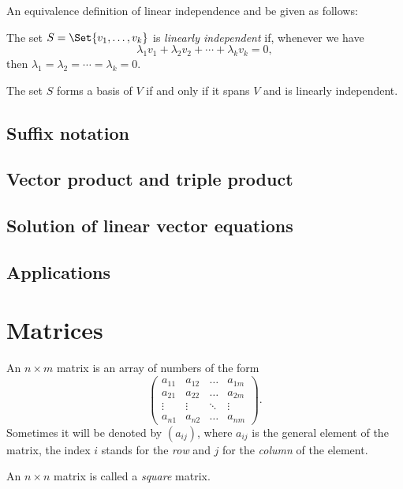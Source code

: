 \documentclass[main.tex]{subfiles}
\begin{document}
			An equivalence definition of linear independence and be given as follows:
			\begin{definition}
				The set $S = \Set{v_1, \ldots, v_k}$ is \textit{linearly independent} if, whenever we have
				\begin{equation*}
					\lambda_1 v_1 + \lambda_2 v_2 + \cdots + \lambda_k v_k = 0,
				\end{equation*}
				then $\lambda_1 = \lambda_2 = \cdots = \lambda_k = 0$.
			\end{definition}
			\begin{theorem}
				The set $S$ forms a basis of $V$ if and only if it spans $V$ and is linearly independent.
			\end{theorem}
		
		
		\subsection{Suffix notation}
		
		\subsection{Vector product and triple product}
		
		\subsection{Solution of linear vector equations}
		
		\subsection{Applications}
		
	\section{Matrices}
		\begin{definition}
			An $n \times m$ matrix is an array of numbers of the form
			\begin{equation*}
				\begin{pmatrix}
				a_{11} & a_{12} & \ldots & a_{1m} \\
				a_{21} & a_{22} & \ldots & a_{2m} \\
				\vdots & \vdots & \ddots & \vdots \\
				a_{n1} & a_{n2} & \ldots & a_{nm}
				\end{pmatrix}.
			\end{equation*}
			Sometimes it will be denoted by $(a_{ij})$, where $a_{ij}$ is the general element of the matrix, the index $i$ stands for the \textit{row} and $j$ for the \textit{column} of the element.
		\end{definition}
			\begin{definition}
				An $n \times n$ matrix is called a \textit{square} matrix.
			\end{definition}
\end{document}
